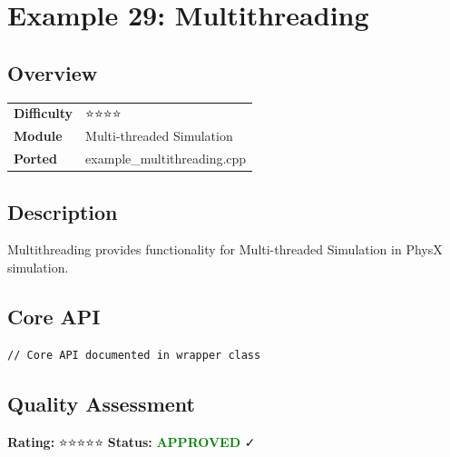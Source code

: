 \section{Example 29: Multithreading}
\subsection{Overview}
\begin{table}[h]
\centering
\begin{tabular}{|l|l|}
\hline
\textbf{Difficulty} & ⭐⭐⭐⭐ \\
\textbf{Module} & Multi-threaded Simulation \\
\textbf{Ported} & example\_multithreading.cpp \\
\hline
\end{tabular}
\end{table}

\subsection{Description}
Multithreading provides functionality for Multi-threaded Simulation in PhysX simulation.

\subsection{Core API}
\begin{lstlisting}
// Core API documented in wrapper class
\end{lstlisting}

\subsection{Quality Assessment}
\textbf{Rating:} ⭐⭐⭐⭐⭐ \quad \textbf{Status:} \textcolor{green}{\textbf{APPROVED}} ✓
